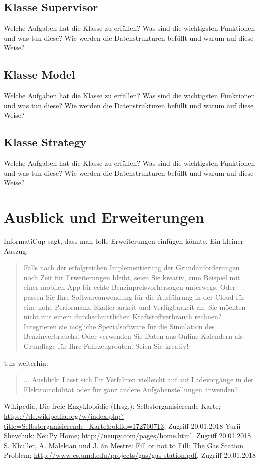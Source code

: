 \documentclass[11pt]{article}
\begin{document}
\subsection{Klasse Supervisor}
	Welche Aufgaben hat die Klasse zu erfüllen? Was sind die wichtigsten Funktionen und was tun diese? Wie werden die Datenstrukturen befüllt und warum auf diese Weise?
\subsection{Klasse Model}
	Welche Aufgaben hat die Klasse zu erfüllen? Was sind die wichtigsten Funktionen und was tun diese? Wie werden die Datenstrukturen befüllt und warum auf diese Weise?
\subsection{Klasse Strategy}
	Welche Aufgaben hat die Klasse zu erfüllen? Was sind die wichtigsten Funktionen und was tun diese? Wie werden die Datenstrukturen befüllt und warum auf diese Weise?

\section{Ausblick und Erweiterungen}
	InformatiCup sagt, dass man tolle Erweiterungen einfügen könnte. Ein kleiner Auszug: 
	\begin{quote}
		Falls nach der erfolgreichen Implementierung der Grundanforderungen noch Zeit für Erweiterungen bleibt, seien Sie kreativ, zum Beispiel mit einer mobilen App für echte Benzinpreisvorhersagen unterwegs. Oder passen Sie Ihre Softwareanwendung für die Ausführung in der Cloud für eine hohe Performanz, Skalierbarkeit und Verfügbarkeit an. Sie möchten nicht mit einem durchschnittlichen Kraftstoffverbrauch rechnen? Integrieren sie mögliche Spezialsoftware für die Simulation des Benzinverbrauchs. Oder verwenden Sie Daten aus Online-Kalendern als Grundlage für Ihre Fahrzeugrouten. Seien Sie kreativ!
	\end{quote}
	Uns weiterhin:
	\begin{quote}
		... Ausblick: Lässt sich Ihr Verfahren vielleicht auf auf Ladevorgänge in der Elektromobilität oder für ganz andere Aufgabenstellungen anwenden?
	\end{quote}
	
	\begin{thebibliography}{999}
		 Wikipedia, Die freie Enzyklopädie (Hrsg.): Selbstorganisierende Karte; \url{https://de.wikipedia.org/w/index.php?title=Selbstorganisierende_Karte&oldid=172760713}, Zugriff 20.01.2018
		 Yurii Shevchuk: NeuPy Home; \url{http://neupy.com/pages/home.html}, Zugriff 20.01.2018
		 S. Khuller, A. Malekian und J. án Mestre: Fill or not to Fill: The Gas Station Problem; \url{http://www.cs.umd.edu/projects/gas/gas-station.pdf},  Zugriff 20.01.2018
	\end{thebibliography}
	
\end{document}
